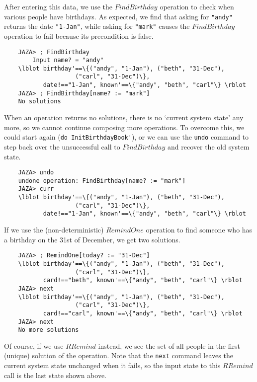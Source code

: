 \documentclass[11pt]{article}
\begin{document}
After entering this data, we use the $FindBirthday$ operation
to check when various people have birthdays.  As expected,
we find that asking for \verb!"andy"! returns the date \verb!"1-Jan"!,
while asking for \verb!"mark"! causes the $FindBirthday$ operation
to fail because its precondition is false.
\begin{verbatim}
    JAZA> ; FindBirthday
        Input name? = "andy"
    \lblot birthday'==\{("andy", "1-Jan"), ("beth", "31-Dec"),
                    ("carl", "31-Dec")\},
           date!=="1-Jan", known'==\{"andy", "beth", "carl"\} \rblot
    JAZA> ; FindBirthday[name? := "mark"]
    No solutions
\end{verbatim}

When an operation returns no solutions, there is no `current system state'
any more, so we cannot continue composing more operations.  To overcome
this, we could start again (\verb!do InitBirthdayBook'!), or we can
use the \verb!undo! command to step back over the unsuccessful
call to $FindBirthday$ and recover the old system state.

\begin{verbatim}
    JAZA> undo
    undone operation: FindBirthday[name? := "mark"]
    JAZA> curr
    \lblot birthday'==\{("andy", "1-Jan"), ("beth", "31-Dec"),
                    ("carl", "31-Dec")\},
           date!=="1-Jan", known'==\{"andy", "beth", "carl"\} \rblot
\end{verbatim}

If we use the (non-deterministic) $RemindOne$ operation to 
find someone who has a birthday on the 31st of December, we get two
solutions. 

\begin{verbatim}
    JAZA> ; RemindOne[today? := "31-Dec"]
    \lblot birthday'==\{("andy", "1-Jan"), ("beth", "31-Dec"),
                    ("carl", "31-Dec")\},
           card!=="beth", known'==\{"andy", "beth", "carl"\} \rblot
    JAZA> next
    \lblot birthday'==\{("andy", "1-Jan"), ("beth", "31-Dec"),
                    ("carl", "31-Dec")\},
           card!=="carl", known'==\{"andy", "beth", "carl"\} \rblot
    JAZA> next
    No more solutions
\end{verbatim}

Of course, if we use $RRemind$ instead, we see the set of all
people in the first (unique) solution of the operation.
Note that the \verb!next! command leaves the current system state
unchanged when it fails, so the input state to this $RRemind$ call
is the last state shown above.
\end{document}
